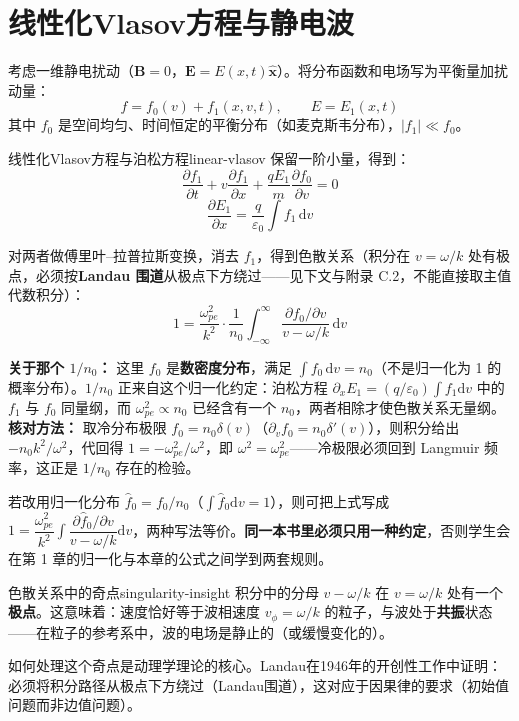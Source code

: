 \documentclass[12pt,a4paper,openany,oneside]{book}
\newcommand{\diff}{\mathrm{d}}
\newcommand{\eps}{\varepsilon}
\newcommand{\vect}[1]{\bm{#1}}
\newcommand{\unitvec}[1]{\hat{\vect{#1}}}
\newcommand{\difficulty}[1]{\marginnote{\hfill\textcolor{coverMid!80}{\rule[-0.1em]{2pt}{0.9em}}\,\textcolor{coverMid}{\footnotesize\textbf{[#1]}}}}
\begin{document}
\section{线性化Vlasov方程与静电波}\difficulty{提高}

考虑一维静电扰动（$\vect{B}=0$，$\vect{E} = E(x,t)\unitvec{x}$）。将分布函数和电场写为平衡量加扰动量：
\[
f = f_0(v) + f_1(x,v,t), \qquad E = E_1(x,t)
\]
其中 $f_0$ 是空间均匀、时间恒定的平衡分布（如麦克斯韦分布），$|f_1| \ll f_0$。

\begin{theorem}{线性化Vlasov方程与泊松方程}{linear-vlasov}
保留一阶小量，得到：
\[
\frac{\partial f_1}{\partial t} + v\frac{\partial f_1}{\partial x} + \frac{qE_1}{m}\frac{\partial f_0}{\partial v} = 0
\]
\[
\frac{\partial E_1}{\partial x} = \frac{q}{\eps_0}\int f_1\,\diff v
\]

对两者做傅里叶--拉普拉斯变换，消去 $f_1$，得到色散关系（积分在 $v=\omega/k$ 处有极点，必须按\textbf{Landau 围道}从极点下方绕过——见下文与附录 C.2，不能直接取主值代数积分）：
\[
1 = \frac{\omega_{pe}^2}{k^2}\cdot\frac{1}{n_0}\int_{-\infty}^{\infty} \frac{\partial f_0/\partial v}{v - \omega/k}\,\diff v
\]

\textbf{关于那个 $1/n_0$：} 这里 $f_0$ 是\textbf{数密度分布}，满足 $\int f_0\,\diff v = n_0$（不是归一化为 1 的概率分布）。$1/n_0$ 正来自这个归一化约定：泊松方程 $\partial_xE_1=(q/\eps_0)\int f_1\diff v$ 中的 $f_1$ 与 $f_0$ 同量纲，而 $\omega_{pe}^2\propto n_0$ 已经含有一个 $n_0$，两者相除才使色散关系无量纲。\textbf{核对方法：} 取冷分布极限 $f_0=n_0\delta(v)$（$\partial_vf_0=n_0\delta'(v)$），则积分给出 $-n_0k^2/\omega^2$，代回得 $1=-\omega_{pe}^2/\omega^2$，即 $\omega^2=\omega_{pe}^2$——冷极限必须回到 Langmuir 频率，这正是 $1/n_0$ 存在的检验。

若改用归一化分布 $\hat f_0=f_0/n_0$（$\int\hat f_0\diff v=1$），则可把上式写成 $1=\dfrac{\omega_{pe}^2}{k^2}\displaystyle\int\dfrac{\partial\hat f_0/\partial v}{v-\omega/k}\diff v$，两种写法等价。\textbf{同一本书里必须只用一种约定}，否则学生会在第 1 章的归一化与本章的公式之间学到两套规则。
\end{theorem}

\begin{insight}{色散关系中的奇点}{singularity-insight}
积分中的分母 $v - \omega/k$ 在 $v = \omega/k$ 处有一个\textbf{极点}。这意味着：速度恰好等于波相速度 $v_\phi = \omega/k$ 的粒子，与波处于\textbf{共振}状态——在粒子的参考系中，波的电场是静止的（或缓慢变化的）。

如何处理这个奇点是动理学理论的核心。Landau在1946年的开创性工作中证明：必须将积分路径从极点下方绕过（Landau围道），这对应于因果律的要求（初始值问题而非边值问题）。
\end{insight}
\end{document}
